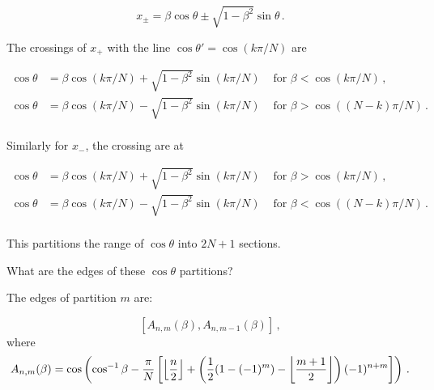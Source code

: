 \begin{equation}
x_\pm = \beta \cos\theta \pm \sqrt{1-\beta^2}\sin\theta\,.
\end{equation}

The crossings of $x_+$ with the line $\cos\theta' = \cos(k\pi/N)$ are

\begin{align*}
\cos\theta &= \beta\cos(k\pi/N) + \sqrt{1-\beta^2}\sin(k\pi/N) & \textrm{ for } \beta < \cos(k\pi/N)\,,\\
\cos\theta &= \beta\cos(k\pi/N) - \sqrt{1-\beta^2}\sin(k\pi/N) & \textrm{ for } \beta > \cos((N-k)\pi/N)\,.\\
\end{align*}

Similarly for $x_-$, the crossing are at

\begin{align*}
\cos\theta &= \beta\cos(k\pi/N) + \sqrt{1-\beta^2}\sin(k\pi/N) & \textrm{ for } \beta > \cos(k\pi/N)\,,\\
\cos\theta &= \beta\cos(k\pi/N) - \sqrt{1-\beta^2}\sin(k\pi/N) & \textrm{ for } \beta < \cos((N-k)\pi/N)\,.\\
\end{align*}

This partitions the range of $\cos\theta$ into $2N+1$ sections.



What are the edges of these $\cos\theta$ partitions?




The edges of partition $m$ are:


\begin{equation}
\left[A_{n,m}(\beta), A_{n,m-1}(\beta)\right]\,,
\end{equation}
where
\begin{equation}
A_{n,m}(\beta) = \cos\left(\cos^{-1}{\beta} - \frac{\pi}{N}\left[\left \lfloor{\frac{n}{2}}\right \rfloor + \left(\frac{1}{2}(1 - (-1)^m) - \left \lfloor{\frac{m+1}{2}}\right \rfloor\right)(-1)^{n+m}\right]\right)\,.
\end{equation}

